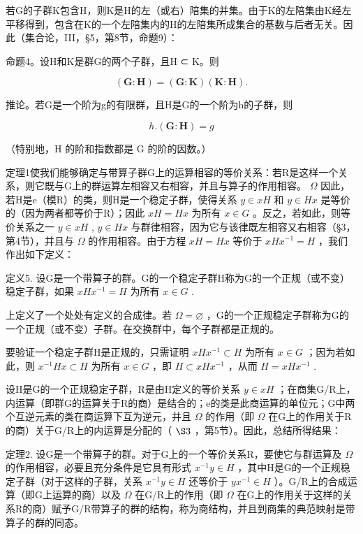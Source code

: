 若G的子群K包含H，则K是H的左（或右）陪集的并集。由于K的左陪集由K经左平移得到，包含在K的一个左陪集内的H的左陪集所成集合的基数与后者无关。因此（集合论，III，§5，第8节，命题9）：

命题4。设H和K是群G的两个子群，且H ⊂ K。则

\[
(\mathbf {G}: \mathbf {H}) = (\mathbf {G}: \mathbf {K}) (\mathbf {K}: \mathbf {H}).\tag{2}
\]

推论。若G是一个阶为g的有限群，且H是G的一个阶为h的子群，则

\[
h. (\mathbf {G}: \mathbf {H}) = g\tag{3}
\]

（特别地，H 的阶和指数都是 G 的阶的因数。）

定理1使我们能够确定与带算子群G上的运算相容的等价关系：若R是这样一个关系，则它既与G上的群运算左相容又右相容，并且与算子的作用相容。 \(\Omega\) 因此，若H是e（模R）的类，则H是一个稳定子群，使得关系 \(y \in xH\) 和 \(y \in Hx\) 是等价的（因为两者都等价于R）；因此 \(xH = Hx\) 为所有 \(x \in G\) 。反之，若如此，则等价关系之一 \(y \in xH\) , \(y \in Hx\) 与群律相容，因为它与该律既左相容又右相容（§3，第4节），并且与 \(\Omega\) 的作用相容。由于方程 \(xH = Hx\) 等价于 \(xHx^{-1} = H\) ，我们作出如下定义：

定义5. 设G是一个带算子的群。G的一个稳定子群H称为G的一个正规（或不变）稳定子群，如果 \(xHx^{-1} = H\) 为所有 \(x \in G\) .

上定义了一个处处有定义的合成律。若 \(\Omega = \varnothing\) ，G的一个正规稳定子群称为G的一个正规（或不变）子群。在交换群中，每个子群都是正规的。

要验证一个稳定子群H是正规的，只需证明 \(xHx^{-1} \subset H\) 为所有 \(x \in G\) ；因为若如此，则 \(x^{-1}Hx \subset H\) 为所有 \(x \in G\) ，即 \(H \subset xHx^{-1}\) ，从而 \(H = xHx^{-1}\) .

设H是G的一个正规稳定子群，R是由H定义的等价关系 \(y \in xH\) ；在商集G/R上，内运算（即群G的运算关于R的商）是结合的；e的类是此商运算的单位元；G中两个互逆元素的类在商运算下互为逆元，并且 \(\Omega\) 的作用（即 \(\Omega\) 在G上的作用关于R的商）关于G/R上的内运算是分配的（ \(\S 3\) ，第5节）。因此，总结所得结果：

定理2. 设G是一个带算子的群。对于G上的一个等价关系R，要使它与群运算及 \(\Omega\) 的作用相容，必要且充分条件是它具有形式 \(x^{-1}y \in H\) ，其中H是G的一个正规稳定子群（对于这样的子群，关系 \(x^{-1}y \in H\) 还等价于 \(yx^{-1} \in H\) ）。G/R上的合成运算（即G上运算的商）以及 \(\Omega\) 在G/R上的作用（即 \(\Omega\) 在G上的作用关于这样的关系R的商）赋予G/R带算子的群的结构，称为商结构，并且到商集的典范映射是带算子的群的同态。

